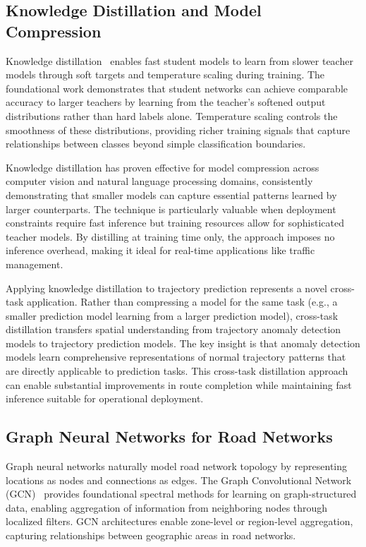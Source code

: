 \subsection{Knowledge Distillation and Model Compression}
\label{sec:lit-distill}

Knowledge distillation~\cite{hintonDistillingKnowledgeNeural2015} enables fast student models to learn from slower teacher models through soft targets and temperature scaling during training. The foundational work demonstrates that student networks can achieve comparable accuracy to larger teachers by learning from the teacher's softened output distributions rather than hard labels alone. Temperature scaling controls the smoothness of these distributions, providing richer training signals that capture relationships between classes beyond simple classification boundaries.

Knowledge distillation has proven effective for model compression across computer vision and natural language processing domains, consistently demonstrating that smaller models can capture essential patterns learned by larger counterparts. The technique is particularly valuable when deployment constraints require fast inference but training resources allow for sophisticated teacher models. By distilling at training time only, the approach imposes no inference overhead, making it ideal for real-time applications like traffic management.

Applying knowledge distillation to trajectory prediction represents a novel cross-task application. Rather than compressing a model for the same task (e.g., a smaller prediction model learning from a larger prediction model), cross-task distillation transfers spatial understanding from trajectory anomaly detection models to trajectory prediction models. The key insight is that anomaly detection models learn comprehensive representations of normal trajectory patterns that are directly applicable to prediction tasks. This cross-task distillation approach can enable substantial improvements in route completion while maintaining fast inference suitable for operational deployment.

\subsection{Graph Neural Networks for Road Networks}
\label{sec:lit-gnn}

Graph neural networks naturally model road network topology by representing locations as nodes and connections as edges. The Graph Convolutional Network (GCN)~\cite{kipfSemisupervisedClassificationGraph2017} provides foundational spectral methods for learning on graph-structured data, enabling aggregation of information from neighboring nodes through localized filters. GCN architectures enable zone-level or region-level aggregation, capturing relationships between geographic areas in road networks.

